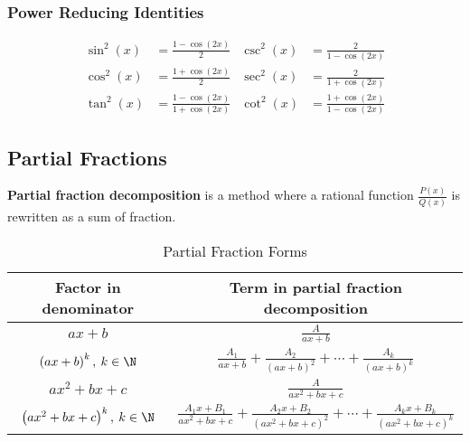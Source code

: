 \documentclass{article}
\begin{document}
\begin{appendix}
    \subsubsection{Power Reducing Identities}
    \begin{align*}
        \sin^2{\left( x \right)} & = \frac{1-\cos{\left( 2x \right)}}{2}                         & \csc^2{\left( x \right)} & = \frac{2}{1-\cos{\left( 2x \right)}}                         \\[5pt]
        \cos^2{\left( x \right)} & = \frac{1+\cos{\left( 2x \right)}}{2}                         & \sec^2{\left( x \right)} & = \frac{2}{1+\cos{\left( 2x \right)}}                         \\[5pt]
        \tan^2{\left( x \right)} & = \frac{1-\cos{\left( 2x \right)}}{1+\cos{\left( 2x \right)}} & \cot^2{\left( x \right)} & = \frac{1+\cos{\left( 2x \right)}}{1-\cos{\left( 2x \right)}}
    \end{align*}
    \subsection{Partial Fractions}
    \begin{definition}
        \textbf{Partial fraction decomposition} is a \linebreak method where
        a rational function \(\displaystyle \frac{P\left( x \right)}{Q\left( x \right)}\) is rewritten
        as a sum of fraction.
    \end{definition}
    \begin{table}[H]
        \renewcommand*{\arraystretch}{1.5}
        \centering
        \begin{tabular}{c c}
            \toprule
            \textbf{Factor in denominator}            & \textbf{Term in partial fraction decomposition}                                                                                                    \\
            \midrule
            \(ax+b\)                                  & \(\displaystyle \frac{A}{ax+b}\)                                                                                                                   \\[10pt]
            \(\left(ax+b\right)^k, \: k \in \N\)      & \(\displaystyle \frac{A_1}{ax+b} + \frac{A_2}{\left( ax+b \right)^2} + \cdots + \frac{A_k}{\left( ax+b \right)^k}\)                                \\[10pt]
            \(ax^2+bx+c\)                             & \(\displaystyle \frac{A}{ax^2+bx+c}\)                                                                                                              \\[10pt]
            \(\left(ax^2+bx+c\right)^k, \: k \in \N\) & \(\displaystyle \frac{A_1x+B_1}{ax^2+bx+c} + \frac{A_2x+B_2}{\left( ax^2+bx+c \right)^2} + \cdots + \frac{A_k x+B_k}{\left( ax^2+bx+c \right)^k}\) \\[10pt]
            \bottomrule
        \end{tabular}
        \caption{Partial Fraction Forms}
    \end{table}

\end{appendix}
\end{document}
